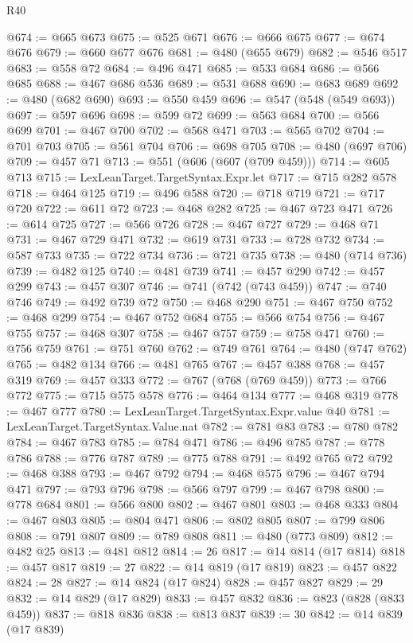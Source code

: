 \begin{lexlean}{R40}
\begin{coremodule}
{{{{{{{{{{{{{{{{{{{{{{{{{{{{{{{{{{{{{{{{{{{{{{{{{{{{{{{{{{{{{{{{{{{{{{{{{{{{{{{{{{{{{{{{{{{{{{{{{{{{{{{{{{{{{@674 := @665 @673
@675 := @525 @671
@676 := @666 @675
@677 := @674 @676
@679 := @660 @677 @676
@681 := @480 (@655 @679)
@682 := @546 @517
@683 := @558 @72
@684 := @496 @471
@685 := @533 @684
@686 := @566 @685
@688 := @467 @686 @536
@689 := @531 @688
@690 := @683 @689
@692 := @480 (@682 @690)
@693 := @550 @459
@696 := @547 (@548 (@549 @693))
@697 := @597 @696
@698 := @599 @72
@699 := @563 @684
@700 := @566 @699
@701 := @467 @700
@702 := @568 @471
@703 := @565 @702
@704 := @701 @703
@705 := @561 @704
@706 := @698 @705
@708 := @480 (@697 @706)
@709 := @457 @71
@713 := @551 (@606 (@607 (@709 @459)))
@714 := @605 @713
@715 := LexLeanTarget.TargetSyntax.Expr.let
@717 := @715 @282 @578
@718 := @464 @125
@719 := @496 @588
@720 := @718 @719
@721 := @717 @720
@722 := @611 @72
@723 := @468 @282
@725 := @467 @723 @471
@726 := @614 @725
@727 := @566 @726
@728 := @467 @727
@729 := @468 @71
@731 := @467 @729 @471
@732 := @619 @731
@733 := @728 @732
@734 := @587 @733
@735 := @722 @734
@736 := @721 @735
@738 := @480 (@714 @736)
@739 := @482 @125
@740 := @481 @739
@741 := @457 @290
@742 := @457 @299
@743 := @457 @307
@746 := @741 (@742 (@743 @459))
@747 := @740 @746
@749 := @492 @739 @72
@750 := @468 @290
@751 := @467 @750
@752 := @468 @299
@754 := @467 @752 @684
@755 := @566 @754
@756 := @467 @755
@757 := @468 @307
@758 := @467 @757
@759 := @758 @471
@760 := @756 @759
@761 := @751 @760
@762 := @749 @761
@764 := @480 (@747 @762)
@765 := @482 @134
@766 := @481 @765
@767 := @457 @388
@768 := @457 @319
@769 := @457 @333
@772 := @767 (@768 (@769 @459))
@773 := @766 @772
@775 := @715 @575 @578
@776 := @464 @134
@777 := @468 @319
@778 := @467 @777
@780 := LexLeanTarget.TargetSyntax.Expr.value @40
@781 := LexLeanTarget.TargetSyntax.Value.nat
@782 := @781 @83
@783 := @780 @782
@784 := @467 @783
@785 := @784 @471
@786 := @496 @785
@787 := @778 @786
@788 := @776 @787
@789 := @775 @788
@791 := @492 @765 @72
@792 := @468 @388
@793 := @467 @792
@794 := @468 @575
@796 := @467 @794 @471
@797 := @793 @796
@798 := @566 @797
@799 := @467 @798
@800 := @778 @684
@801 := @566 @800
@802 := @467 @801
@803 := @468 @333
@804 := @467 @803
@805 := @804 @471
@806 := @802 @805
@807 := @799 @806
@808 := @791 @807
@809 := @789 @808
@811 := @480 (@773 @809)
@812 := @482 @25
@813 := @481 @812
@814 := 26
@817 := @14 @814 (@17 @814)
@818 := @457 @817
@819 := 27
@822 := @14 @819 (@17 @819)
@823 := @457 @822
@824 := 28
@827 := @14 @824 (@17 @824)
@828 := @457 @827
@829 := 29
@832 := @14 @829 (@17 @829)
@833 := @457 @832
@836 := @823 (@828 (@833 @459))
@837 := @818 @836
@838 := @813 @837
@839 := 30
@842 := @14 @839 (@17 @839)
}}}}}}}}}}}}}}}}}}}}}}}}}}}}}}}}}}}}}}}}}}}}}}}}}}}}}}}}}}}}}}}}}}}}}}}}}}}}}}}}}}}}}}}}}}}}}}}}}}}}}}}}}}}}}
\end{coremodule}
\end{lexlean}
